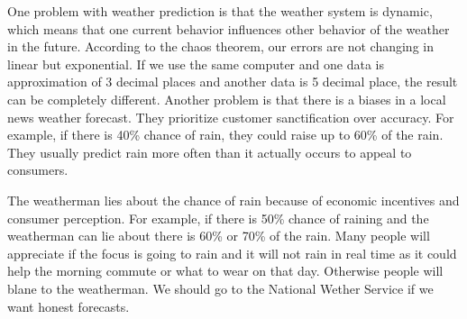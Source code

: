 \documentclass[12pt]{article}
\begin{document}

\begin{enumerate}


One problem with weather prediction is that the weather system is dynamic, which means that one current behavior influences other behavior of the weather in the future. According to the chaos theorem, our errors are not changing in linear but exponential. If we use the same computer and one data is approximation of 3 decimal places and another data is 5 decimal place, the result can be completely different. Another problem is that there is a biases in a local news weather forecast. They prioritize customer sanctification over accuracy. For example, if there is 40\% chance of rain, they could raise up to 60\% of the rain. They usually predict rain more often than it actually occurs to appeal to consumers.


The weatherman lies about the chance of rain because of economic incentives and consumer perception. For example, if there is 50\% chance of raining and the weatherman can lie about there is 60\% or 70\% of the rain. Many people will appreciate if the focus is going to rain and it will not rain in real time as it could help the morning commute or what to wear on that day. Otherwise people will blane to the weatherman. We should go to the National Wether Service if we want honest forecasts.



\end{enumerate}
\end{document}
